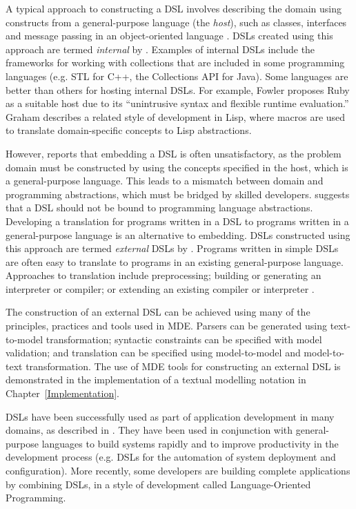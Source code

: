 A typical approach to constructing a DSL involves describing the domain using constructs from a general-purpose language (the \textit{host}), such as classes, interfaces and message passing in an object-oriented language \cite{dmitriev04lop}. DSLs created using this approach are termed \emph{internal} by \cite{fowler10dsls}. Examples of internal DSLs include the frameworks for working with collections that are included in some programming languages (e.g. STL for C++, the Collections API for Java). Some languages are better than others for hosting internal DSLs. For example, Fowler \cite{fowler05language} proposes Ruby as a suitable host due to its ``unintrusive syntax and flexible runtime evaluation.'' Graham \cite{graham93lisp} describes a related style of development in Lisp, where macros are used to translate domain-specific concepts to Lisp abstractions.

However, \cite{dmitriev04lop} reports that embedding a DSL is often unsatisfactory, as the problem domain must be constructed by using the concepts specified in the host, which is a general-purpose language. This leads to a mismatch between domain and programming abstractions, which must be bridged by skilled developers. \cite{dmitriev04lop} suggests that a DSL should not be bound to programming language abstractions. Developing a translation for programs written in a DSL to programs written in a general-purpose language is an alternative to embedding. DSLs constructed using this approach are termed \emph{external} DSLs by \cite{fowler10dsls}. Programs written in simple DSLs are often easy to translate to programs in an existing general-purpose language. Approaches to translation include preprocessing; building or generating an interpreter or compiler; or extending an existing compiler or interpreter \cite{dmitriev04lop}.

The construction of an external DSL can be achieved using many of the principles, practices and tools used in MDE. Parsers can be generated using text-to-model transformation; syntactic constraints can be specified with model validation; and translation can be specified using model-to-model and model-to-text transformation. The use of MDE tools for constructing an external DSL is demonstrated in the implementation of a textual modelling notation in Chapter~\ref{Implementation}.

DSLs have been successfully used as part of application development in many domains, as described in \cite{deursen00dslbib}. They have been used in conjunction with general-purpose languages to build systems rapidly and to improve productivity in the development process (e.g. DSLs for the automation of system deployment and configuration). More recently, some developers are building complete applications by combining DSLs, in a style of development called Language-Oriented Programming. 

